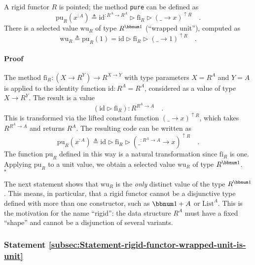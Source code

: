 A rigid functor $R$ is pointed; the method \lstinline!pure! can
be defined as
\[
\text{pu}_{R}(x^{:A})\triangleq\text{id}^{:R^{A}\rightarrow R^{A}}\triangleright\text{fi}_{R}\triangleright(\_\rightarrow x)^{\uparrow R}\quad.
\]
There is a selected value $\text{wu}_{R}$ of type $R^{\bbnum 1}$
(\textsf{``}wrapped unit\textsf{''}), computed as 
\begin{equation}
\text{wu}_{R}\triangleq\text{pu}_{R}(1)=\text{id}\triangleright\text{fi}_{R}\triangleright(\_\rightarrow1)^{\uparrow R}\quad.\label{eq:rigid-functor-def-of-wrapped-unit}
\end{equation}


\paragraph{Proof}

The method $\text{fi}_{R}:(X\rightarrow R^{Y})\rightarrow R^{X\rightarrow Y}$
with type parameters $X=R^{A}$ and $Y=A$ is applied to the identity
function $\text{id}:R^{A}=R^{A}$, considered as a value of type $X\rightarrow R^{Y}$.
The result is a value
\[
(\text{id}\triangleright\text{fi}_{R}):R^{R^{A}\rightarrow A}\quad.
\]
This is transformed via the lifted constant function $\left(\_\rightarrow x\right)^{\uparrow R}$,
which takes $R^{R^{A}\rightarrow A}$ and returns $R^{A}$. The resulting
code can be written as
\[
\text{pu}_{R}(x^{:A})\triangleq\text{id}\triangleright\text{fi}_{R}\triangleright(\_^{:R^{A}\rightarrow A}\rightarrow x)^{\uparrow R}\quad.
\]
The function $\text{pu}_{R}$ defined in this way is a natural transformation
since $\text{fi}_{R}$ is one. Applying $\text{pu}_{R}$ to a unit
value, we obtain a selected value $\text{wu}_{R}$ of type $R^{\bbnum 1}$.
$\quad$$\square$

The next statement shows that $\text{wu}_{R}$ is the \emph{only}
distinct value of the type $R^{\bbnum 1}$. This means, in particular,
that a rigid functor cannot be a disjunctive type defined with more
than one constructor, such as $\bbnum 1+A$ or $\text{List}^{A}$.
This is the motivation for the name \textsf{``}rigid\textsf{''}: the data structure
$R^{A}$ must have a fixed \textsf{``}shape\textsf{''} and cannot be a disjunction
of several variants. 

\subsubsection{Statement \label{subsec:Statement-rigid-functor-wrapped-unit-is-unit}\ref{subsec:Statement-rigid-functor-wrapped-unit-is-unit}}

